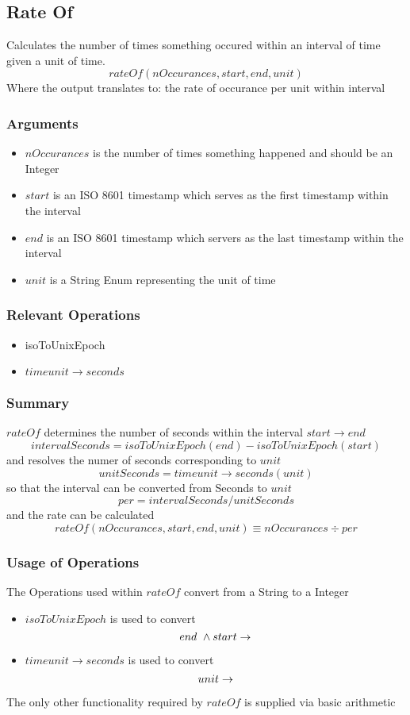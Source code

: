 \documentclass[../main.tex]{subfiles}
\begin{document}
\subsection{Rate Of}
Calculates the number of times something occured within an interval of time given a unit of time.
$$rateOf(nOccurances, start, end, unit)$$
Where the output translates to: the rate of occurance per unit within interval

\subsubsection{Arguments}
\begin{itemize}
\item $nOccurances$ is the number of times something happened and should be an Integer
\item $start$ is an ISO 8601 timestamp which serves as the first timestamp within the interval
\item $end$ is an ISO 8601 timestamp which servers as the last timestamp within the interval
\item $unit$ is a String Enum representing the unit of time
\end{itemize}

\subsubsection{Relevant Operations}
\begin{itemize}
\item isoToUnixEpoch
\item $timeunit \to seconds$
\end{itemize}

\subsubsection{Summary}
$rateOf$ determines the number of seconds within the interval $start \to end$
$$intervalSeconds = isoToUnixEpoch(end) - isoToUnixEpoch(start)$$
and resolves the numer of seconds corresponding to $unit$
$$unitSeconds = timeunit \to seconds(unit)$$
so that the interval can be converted from Seconds to $unit$
$$per = intervalSeconds / unitSeconds$$
and the rate can be calculated
$$rateOf(nOccurances, start, end, unit) \equiv nOccurances \div per$$

\subsubsection{Usage of Operations}
The Operations used within $rateOf$ convert from a String to a Integer
\begin{itemize}
\item $isoToUnixEpoch$ is used to convert
  $$end \ \land start \to \real$$
\item $timeunit \to seconds$ is used to convert
  $$unit \to \real$$
\end{itemize}
The only other functionality required by $rateOf$ is supplied via basic arithmetic
\end{document}
